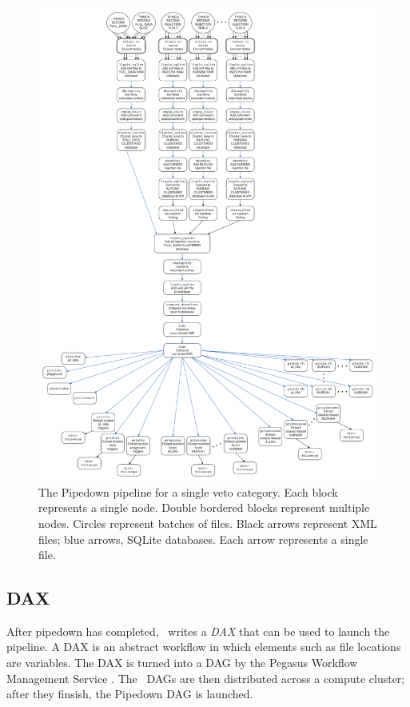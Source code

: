 \begin{figure}[p]
\begin{center}
\includegraphics[width=6in]{figures/PipedownDiagram.pdf}
\end{center}
\caption{
The Pipedown pipeline for a single veto category. Each block represents a
single node. Double bordered blocks represent multiple nodes. Circles represent
batches of files. Black arrows represent XML files; blue arrows, SQLite
databases. Each arrow represents a single file.
}
\label{fig:PipedownDiagram}
\end{figure}

\subsection{DAX}
\label{sec:DAX}

After pipedown has completed, \ihope~writes a \emph{DAX} that can be used to
launch the pipeline. A DAX is an abstract workflow in which elements such as
file locations are variables. The DAX is turned into a \ac{DAG} by the Pegasus
Workflow Management Service \cite{dax:Pegasus}. The \hipe~\acp{DAG} are then
distributed across a compute cluster; after they finsish, the Pipedown \ac{DAG}
is launched.

